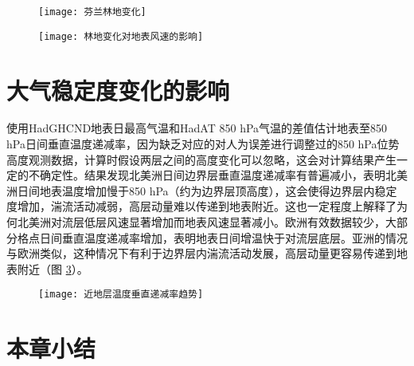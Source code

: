 \begin{figure}[!t]
    \centering
    \texttt{[image: 芬兰林地变化]}
        \label{fig:Finlandwoodlandchange}
\end{figure}

\begin{figure}[!b]
    \centering
    \texttt{[image: 林地变化对地表风速的影响]}
        \label{fig:woodlandonwind}
\end{figure}

\section{大气稳定度变化的影响}

使用HadGHCND地表日最高气温和HadAT 850 hPa气温的差值估计地表至850 hPa日间垂直温度递减率，因为缺乏对应的对人为误差进行调整过的850 hPa位势高度观测数据，计算时假设两层之间的高度变化可以忽略，这会对计算结果产生一定的不确定性。结果发现北美洲日间边界层垂直温度递减率有普遍减小，表明北美洲日间地表温度增加慢于850 hPa（约为边界层顶高度），这会使得边界层内稳定度增加，湍流活动减弱，高层动量难以传递到地表附近。这也一定程度上解释了为何北美洲对流层低层风速显著增加而地表风速显著减小。欧洲有效数据较少，大部分格点日间垂直温度递减率增加，表明地表日间增温快于对流层底层。亚洲的情况与欧洲类似，这种情况下有利于边界层内湍流活动发展，高层动量更容易传递到地表附近（图 \ref{fig:lapserate}）。

\begin{figure}[!htbp]
    \centering
    \texttt{[image: 近地层温度垂直递减率趋势]}
        \label{fig:lapserate}
\end{figure}

\section{本章小结}

